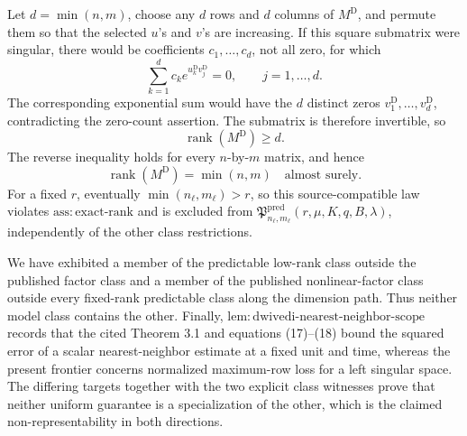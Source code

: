 Let \(d=\min(n,m)\), choose any \(d\) rows and \(d\) columns of \(M^{\mathrm D}\), and permute them so that the selected \(u\)'s and \(v\)'s are increasing.  If this square submatrix were singular, there would be coefficients \(c_1,\ldots,c_d\), not all zero, for which
\[
 \sum_{k=1}^d c_k e^{u_k^{\mathrm D}v_j^{\mathrm D}}=0,
 \qquad j=1,\ldots,d.
\]
The corresponding exponential sum would have the \(d\) distinct zeros \(v_1^{\mathrm D},\ldots,v_d^{\mathrm D}\), contradicting the zero-count assertion.  The submatrix is therefore invertible, so
\[
 \operatorname{rank}(M^{\mathrm D})\ge d.
\]
The reverse inequality holds for every \(n\)-by-\(m\) matrix, and hence
\[
 \operatorname{rank}(M^{\mathrm D})=\min(n,m)
 \quad\text{almost surely}.
\]
For a fixed \(r\), eventually \(\min(n_\ell,m_\ell)>r\), so this source-compatible law violates \(\mathrm{ass:exact\mbox{-}rank}\) and is excluded from \(\mathfrak P^{\mathrm{pred}}_{n_\ell,m_\ell}(r,\mu,K,q,B,\lambda)\), independently of the other class restrictions.

We have exhibited a member of the predictable low-rank class outside the published factor class and a member of the published nonlinear-factor class outside every fixed-rank predictable class along the dimension path.  Thus neither model class contains the other.  Finally, \(\mathrm{lem:dwivedi\mbox{-}nearest\mbox{-}neighbor\mbox{-}scope}\) records that the cited Theorem 3.1 and equations (17)--(18) bound the squared error of a scalar nearest-neighbor estimate at a fixed unit and time, whereas the present frontier concerns normalized maximum-row loss for a left singular space.  The differing targets together with the two explicit class witnesses prove that neither uniform guarantee is a specialization of the other, which is the claimed non-representability in both directions.
